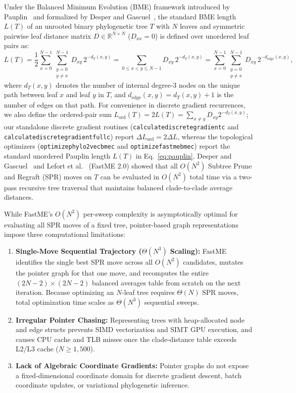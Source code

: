 \documentclass[11pt,a4paper]{article}
\makeatletter
\DeclareRobustCommand{\_}{\ifmmode\nfss@text{\textunderscore}\else\textunderscore\allowbreak\fi}
\theoremstyle{definition}
\makeatother
\begin{document}
Under the Balanced Minimum Evolution (BME) framework introduced by Pauplin~\cite{pauplin2000direct} and formalized by Desper and Gascuel~\cite{desper2002fast}, the standard BME length $L(T)$ of an unrooted binary phylogenetic tree $T$ with $N$ leaves and symmetric pairwise leaf distance matrix $D \in \mathbb{R}^{N \times N}$ ($D_{xx} = 0$) is defined over unordered leaf pairs as:
\begin{equation}
L(T) = \frac{1}{2} \sum_{x=0}^{N-1} \sum_{\substack{y=0 \\ y \neq x}}^{N-1} D_{xy} \, 2^{-d_T(x, y)} = \sum_{0 \le x < y \le N-1} D_{xy} \, 2^{-d_T(x, y)} = \sum_{x=0}^{N-1} \sum_{\substack{y=0 \\ y \neq x}}^{N-1} D_{xy} \, 2^{-d_{\text{edge}}(x, y)},
\label{eq:pauplin}
\end{equation}
where $d_T(x, y)$ denotes the number of internal degree-3 nodes on the unique path between leaf $x$ and leaf $y$ in $T$, and $d_{\text{edge}}(x, y) = d_T(x, y) + 1$ is the number of edges on that path. For convenience in discrete gradient recurrences, we also define the ordered-pair sum $L_{\text{ord}}(T) = 2 L(T) = \sum_{x \neq y} D_{xy} 2^{-d_T(x,y)}$; our standalone discrete gradient routines (\texttt{calculate\_discrete\_gradient\_c} and \texttt{calculate\_discrete\_gradient\_full\_c}) report $\Delta L_{\text{ord}} = 2 \Delta L$, whereas the topological optimizers (\texttt{optimize\_phylo2vec\_bme\_c} and \texttt{optimize\_fastme\_bme\_c}) report the standard unordered Pauplin length $L(T)$ in Eq.~\eqref{eq:pauplin}. Desper and Gascuel~\cite{desper2002fast} and Lefort et al.~\cite{lefort2015fastme} (FastME 2.0) showed that all $O(N^2)$ Subtree Prune and Regraft (SPR) moves on $T$ can be evaluated in $O(N^2)$ total time via a two-pass recursive tree traversal that maintains balanced clade-to-clade average distances.

While FastME's $O(N^2)$ per-sweep complexity is asymptotically optimal for evaluating all SPR moves of a fixed tree, pointer-based graph representations impose three computational limitations:
\begin{enumerate}
    \item \textbf{Single-Move Sequential Trajectory ($\Theta(N^3)$ Scaling):} FastME identifies the single best SPR move across all $O(N^2)$ candidates, mutates the pointer graph for that one move, and recomputes the entire $(2N-2) \times (2N-2)$ balanced averages table from scratch on the next iteration. Because optimizing an $N$-leaf tree requires $\Theta(N)$ SPR moves, total optimization time scales as $\Theta(N^3)$ sequential sweeps.
    \item \textbf{Irregular Pointer Chasing:} Representing trees with heap-allocated node and edge structs prevents SIMD vectorization and SIMT GPU execution, and causes CPU cache and TLB misses once the clade-distance table exceeds L2/L3 cache ($N \ge 1{,}500$).
    \item \textbf{Lack of Algebraic Coordinate Gradients:} Pointer graphs do not expose a fixed-dimensional coordinate domain for discrete gradient descent, batch coordinate updates, or variational phylogenetic inference.
\end{enumerate}
\end{document}
